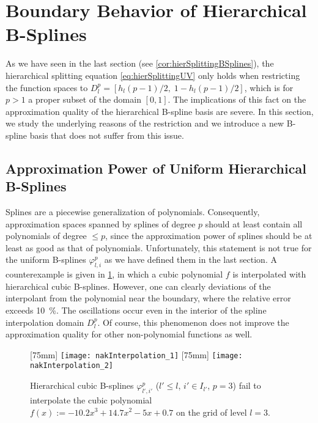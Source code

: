 \section{Boundary Behavior of Hierarchical B-Splines}
\label{sec:23boundary}

As we have seen in the last section (see \cref{cor:hierSplittingBSplines}),
the hierarchical splitting equation \eqref{eq:hierSplittingUV}
only holds when restricting the function spaces to
$D_l^p = [h_l (p-1)/2,\; 1 - h_l (p-1)/2]$,
which is for $p > 1$ a proper subset of the domain $[0, 1]$.
The implications of this fact on the approximation quality
of the hierarchical B-spline basis are severe.
In this section, we study the underlying reasons of the restriction and
we introduce a new B-spline basis that does not suffer from this issue.



\subsection{Approximation Power of Uniform Hierarchical B-Splines}

Splines are a piecewise generalization of polynomials.
Consequently, approximation spaces spanned by splines of degree $p$ should
at least contain all polynomials of degree $\le p$,
since the approximation power of splines should be at least as good
as that of polynomials.
Unfortunately, this statement is not true for the uniform B-splines
$\varphi_{l,i}^p$ as we have defined them in the last section.
A counterexample is given in \cref{fig:nakInterpolation},
in which a cubic polynomial $f$ is interpolated with
hierarchical cubic B-splines.
However, one can clearly deviations of the interpolant from the polynomial
near the boundary, where the relative error exceeds \SI{10}{\percent}.
The oscillations occur even in the interior of the
spline interpolation domain $D_l^p$.
Of course, this phenomenon does not improve the approximation quality
for other non-polynomial functions as well.

\begin{figure}
  [75mm]{%
    \texttt{[image: nakInterpolation\_1]}%
  }%
  \hfill%
  [75mm]{%
    \texttt{[image: nakInterpolation\_2]}%
  }%
  \caption{%
    Hierarchical cubic B-splines $\varphi_{l',i'}^p$
    ($l' \le l$, $i' \in I_{l'}$, $p = 3$)
    fail to interpolate the cubic polynomial
    $f(x) := -10.2 x^3 + 14.7 x^2 - 5x + 0.7$
    on the grid of level $l = 3$.%
  }
  \label{fig:nakInterpolation}
\end{figure}

